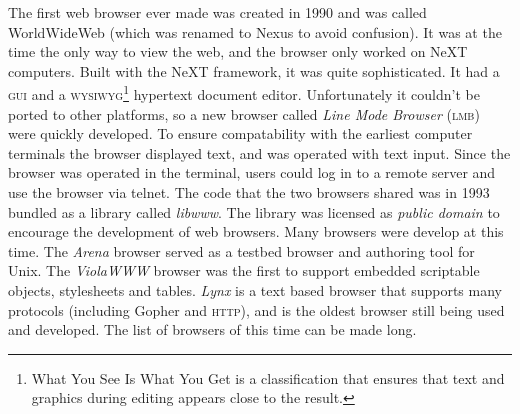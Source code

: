 \documentclass[a4paper,11pt]{kth-mag}
\begin{document}
        The first web browser ever made was created in 1990 and was called WorldWideWeb (which was renamed to Nexus to avoid confusion).
        It was at the time the only way to view the web, and the browser only worked on NeXT computers.
        Built with the NeXT framework, it was quite sophisticated.
        It had a \textsc{gui} and a \textsc{wysiwyg}\footnote{What You See Is What You Get is a classification that ensures that text and graphics during editing appears close to the result.} hypertext document editor.
        Unfortunately it couldn't be ported to other platforms, so a new browser called \emph{Line Mode Browser} (\textsc{lmb}) were quickly developed.
        To ensure compatability with the earliest computer terminals the browser displayed text, and was operated with text input.
        Since the browser was operated in the terminal, users could log in to a remote server and use the browser via telnet.
        The code that the two browsers shared was in 1993 bundled as a library called \emph{libwww}.
        The library was licensed as \emph{public domain} to encourage the development of web browsers.
        Many browsers were develop at this time.
        The \emph{Arena} browser served as a testbed browser and authoring tool for Unix.
        The \emph{ViolaWWW} browser was the first to support embedded scriptable objects, stylesheets and tables.
        \emph{Lynx} is a text based browser that supports many protocols (including Gopher and \textsc{http}), and is the oldest browser still being used and developed.
        The list of browsers of this time can be made long.
\end{document}
